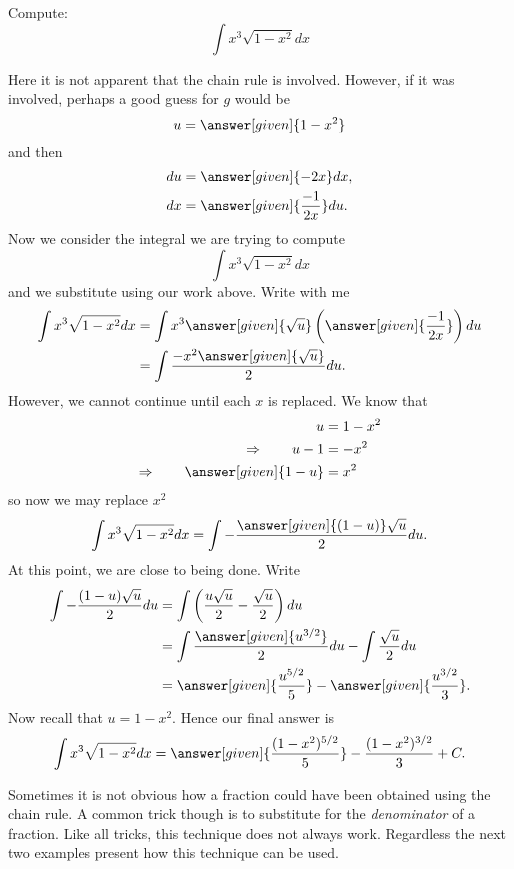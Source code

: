 \documentclass{ximera}
\begin{document}
\begin{example}
  Compute:
\[
\int x^3\sqrt{1-x^2} dx
\]
\begin{explanation}
Here it is not apparent that the chain rule is involved. However, if
it was involved, perhaps a good guess for $g$ would be
\[
u = \answer[given]{1-x^2}
\]
and then
\begin{align*}
  du &= \answer[given]{-2x} dx, \\
  dx &= \answer[given]{\frac{-1}{2x}} du.
\end{align*}
Now we consider the integral we are trying to compute
\[
\int x^3\sqrt{1-x^2} dx
\]
and we substitute using our work above. Write with me
\begin{align*}
  \int x^3\sqrt{1-x^2} dx &= \int x^3 \answer[given]{\sqrt{u}} \left( \answer[given]{\frac{-1}{2x}} \right) du \\
  &= \int \frac{-x^2 \answer[given]{\sqrt{u}}}{2} du.
\end{align*}
However, we cannot continue until each $x$ is replaced. We know that
\begin{align*}
u &= 1-x^2 \\
\Rightarrow \qquad u -1 &= -x^2\\
\Rightarrow \qquad \answer[given]{1- u} &= x^2
\end{align*}
so now we may replace $x^2$
\[
\int x^3\sqrt{1-x^2} dx = \int -\frac{\answer[given]{(1-u)} \sqrt{u}}{2} du.
\]
At this point, we are close to being done. Write
\begin{align*}
\int -\frac{(1-u)\sqrt{u}}{2} du &= \int \left(\frac{u\sqrt{u}}{2} - \frac{\sqrt{u}}{2}\right) du \\
&= \int \frac{\answer[given]{u^{3/2}}}{2} du - \int \frac{\sqrt{u}}{2} du \\
&= \answer[given]{\frac{u^{5/2}}{5}} - \answer[given]{\frac{u^{3/2}}{3}}.
\end{align*}
Now recall that $u = 1-x^2$. Hence our final answer is
\[
\int x^3\sqrt{1-x^2} dx = \answer[given]{\frac{(1-x^2)^{5/2}}{5}} - \frac{(1-x^2)^{3/2}}{3}+C.
\]
\end{explanation}
\end{example}


Sometimes it is not obvious how a fraction could have been obtained
using the chain rule.  A common trick though is to substitute for the
\textit{denominator} of a fraction.  Like all tricks, this technique
does not always work. Regardless the next two examples present how
this technique can be used.
\end{document}
